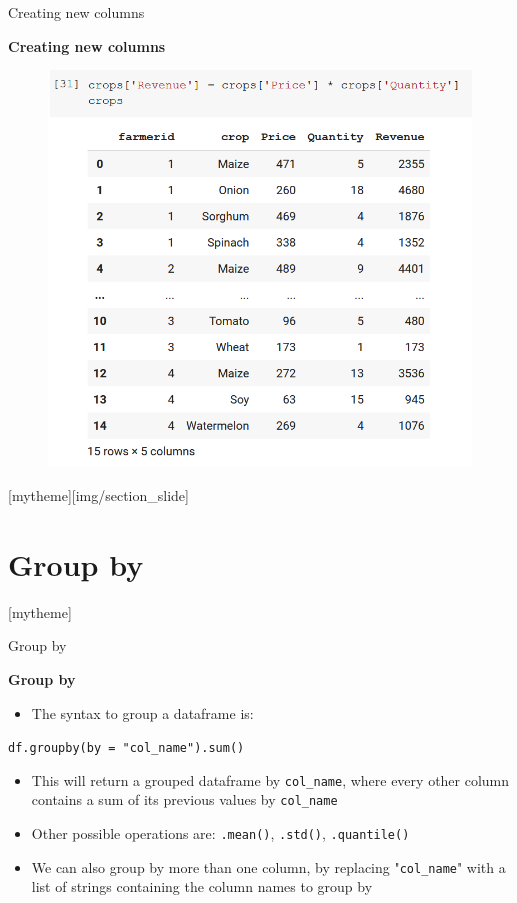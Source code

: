\documentclass[aspectratio=169]{beamer}
\newcommand{\sectionpic}[2]{
	\setbeamertemplate{section page}[mytheme][#2]
	\section{#1}
	\setbeamertemplate{section page}[mytheme]
}
\begin{document}
\begin{frame}{Creating new columns}

	\textbf{Creating new columns}

	\begin{figure}
		\centering
		\includegraphics[width=0.5\linewidth]{img/column_generation.png}
	\end{figure}

\end{frame}

\sectionpic{Group by}{img/section_slide}

\begin{frame}{Group by}

	\textbf{Group by}

	\begin{itemize}
		\item The syntax to group a dataframe is:
	\end{itemize}

	\hspace{7mm} \texttt{df.groupby(by = "col\_name").sum()}

	\begin{itemize}
		\item This will return a grouped dataframe by \texttt{col\_name}, where every other column contains a sum of its previous values by \texttt{col\_name}
		\item Other possible operations are: \texttt{.mean()}, \texttt{.std()}, \texttt{.quantile()}
		\item We can also group by more than one column, by replacing "\texttt{col\_name}" with a list of strings containing the column names to group by
	\end{itemize}

\end{frame}
\end{document}
